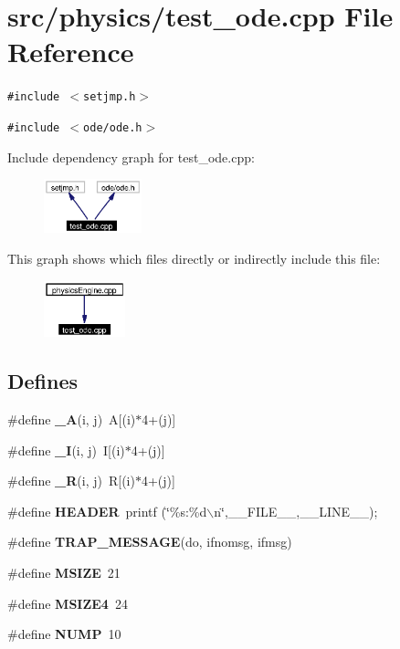 \section{src/physics/test\_\-ode.cpp File Reference}
\label{test__ode_8cpp}
{\tt \#include $<$setjmp.h$>$}\par
{\tt \#include $<$ode/ode.h$>$}\par


Include dependency graph for test\_\-ode.cpp:\begin{figure}[H]
\begin{center}
\leavevmode
\includegraphics[width=80pt]{test__ode_8cpp__incl}
\end{center}
\end{figure}


This graph shows which files directly or indirectly include this file:\begin{figure}[H]
\begin{center}
\leavevmode
\includegraphics[width=67pt]{test__ode_8cpp__dep__incl}
\end{center}
\end{figure}
\subsection*{Defines}
\begin{CompactItemize}
\item 
\#define {\bf \_\-A}(i, j)\ A[(i)$\ast$4+(j)]
\item 
\#define {\bf \_\-I}(i, j)\ I[(i)$\ast$4+(j)]
\item 
\#define {\bf \_\-R}(i, j)\ R[(i)$\ast$4+(j)]
\item 
\#define {\bf HEADER}\ printf (\char`\"{}\%s:\%d$\backslash$n\char`\"{},\_\-\_\-FILE\_\-\_\-,\_\-\_\-LINE\_\-\_\-);
\item 
\#define {\bf TRAP\_\-MESSAGE}(do, ifnomsg, ifmsg)
\item 
\#define {\bf MSIZE}\ 21
\item 
\#define {\bf MSIZE4}\ 24
\item 
\#define {\bf NUMP}\ 10
\end{CompactItemize}
